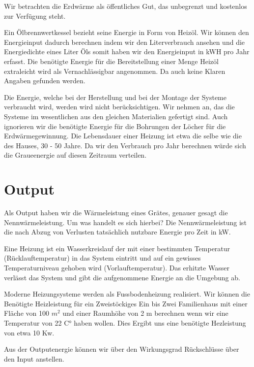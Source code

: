 Wir betrachten die Erdwärme als öffentliches Gut, das unbegrenzt und kostenlos
zur Verfügung steht.

Ein Ölbrennwertkessel bezieht seine Energie in Form von Heizöl.
Wir können den Energieinput dadurch berechnen indem wir den Literverbrauch
ansehen und die Energiedichte eines Liter Öls somit haben wir den
Energieinput in kWH pro Jahr erfasst.
Die benötigte Energie für die Bereitstellung einer Menge Heizöl extraleicht
wird als Vernachlässigbar angenommen. Da auch keine Klaren Angaben gefunden
werden.

Die Energie, welche bei der Herstellung und bei der Montage der Systeme
verbraucht wird, werden wird nicht berücksichtigen.
Wir nehmen an, das die Systeme im wesentlichen aus den gleichen Materialien
gefertigt sind. Auch ignorieren wir die benötigte Energie für die Bohrungen der
Löcher für die Erdwärmegewinnung.
Die Lebensdauer einer Heizung ist etwa die selbe wie die des Hauses, 
30 - 50 Jahre.
Da wir den Verbrauch pro Jahr berechnen würde sich die Graueenergie auf diesen
Zeitraum verteilen.

\section{Output}

Als Output haben wir die Wärmeleistung eines Grätes, genauer gesagt die
Nennwärmeleistung.
Um was handelt es sich hierbei?
Die Nennwärmeleistung ist die nach Abzug von Verlusten tatsächlich nutzbare
Energie pro Zeit in kW.\cite{heizung:nennwarmeleistung}

Eine Heizung ist ein Wasserkreislauf der mit einer bestimmten Temperatur
(Rücklauftemperatur) in das System eintritt und auf ein gewisses Temperaturniveau
gehoben wird (Vorlauftemperatur). Das erhitzte Wasser verlässt das System und
gibt die aufgenommene Energie an die Umgebung ab.
 
Moderne Heizungsysteme werden als Fussbodenheizung realisiert.
Wir können die Benötigte Heizleistung für ein Zweistöckiges Ein bis Zwei
Familienhaus mit einer Fläche von 100 $m^2$ und einer Raumhöhe von 2 m berechnen
wenn wir eine Temperatur von 22 C° haben wollen.
Dies Ergibt uns eine benötigte Hezleistung von etwa 10 Kw.
\cite{heizung:berechnung}

Aus der Outputenergie können wir über den Wirkungsgrad Rückschlüsse über
den Input anstellen.










